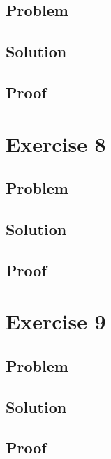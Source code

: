 \documentclass[a4paper,11pt]{article}
\begin{document}
\subsection{Problem}

\subsection{Solution}

\subsection{Proof}

\section{Exercise 8}
\subsection{Problem}

\subsection{Solution}

\subsection{Proof}

\section{Exercise 9}
\subsection{Problem}

\subsection{Solution}

\subsection{Proof}
\end{document}
